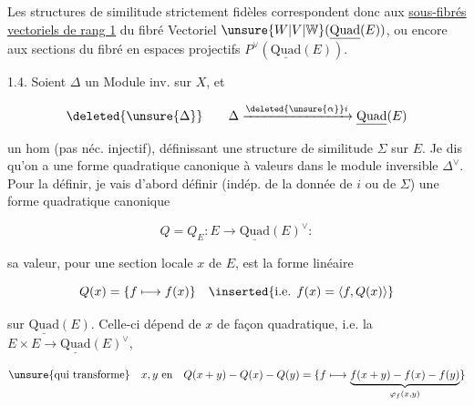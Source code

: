 
Les structures de similitude strictement fidèles correspondent donc aux \uline{sous-fibrés vectoriels de rang 1} du fibré Vectoriel $\unsure{W|V|\mathbb W}(\underline{\mathrm{Quad}}(E))$, ou encore aux sections du fibré en espaces projectifs $P^\vee(\underline{\mathrm{Quad}}(E))$.

1.4. Soient $\Delta$ un Module inv. sur $X$, et

\[\deleted{\unsure{\Delta}}\qquad\Delta\xrightarrow{\deleted{\unsure{\alpha}}i}\underline{\mathrm{Quad}}(E)\]

un hom (pas néc. injectif), définissant  une structure de similitude $\Sigma$ sur $E$. Je dis qu'on a une forme quadratique  canonique à valeurs dans le module inversible $\Delta^\vee$. Pour la définir, je vais d'abord définir (indép. de la donnée de $i$ ou de $\Sigma$) une forme quadratique canonique

\[Q=Q_E:E\longrightarrow\underline{\mathrm{Quad}}(E)^\vee:\]

 sa valeur, pour une section locale $x$ de $E$, est la forme linéaire

\[Q(x)=\{f\longmapsto f(x)\}\quad\inserted{\text{i.e. }f(x)=\langle f,Q(x)\rangle}\]

 sur $\underline{\mathrm{Quad}}(E)$. Celle-ci dépend de $x$ de façon quadratique, i.e. la  $E\times E\longrightarrow\underline{\mathrm{Quad}}(E)^\vee$,

\[
\unsure{\text{qui transforme}}\quad x,y\ \text{en}\quad Q(x+y)-Q(x)-Q(y)=\{f\longmapsto\underbrace{f(x+y)-f(x)-f(y)}_{\varphi_f(x,y)}\}
\]
